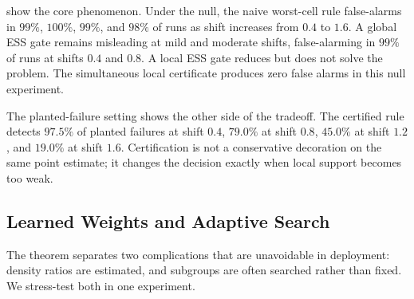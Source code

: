 \begin{table}[t]
\centering
\caption{Synthetic audit decisions. Entries are alarm rates over \(200\) seeds. Under the null, every alarm is false. In the planted setting, the certified-alarm column is power.}
\label{tab:synthetic-decisions}
\end{table}

 show the core phenomenon. Under the null, the naive worst-cell rule false-alarms in \(99\%\), \(100\%\), \(99\%\), and \(98\%\) of runs as shift increases from \(0.4\) to \(1.6\). A global ESS gate remains misleading at mild and moderate shifts, false-alarming in \(99\%\) of runs at shifts \(0.4\) and \(0.8\). A local ESS gate reduces but does not solve the problem. The simultaneous local certificate produces zero false alarms in this null experiment.

The planted-failure setting shows the other side of the tradeoff. The certified rule detects \(97.5\%\) of planted failures at shift \(0.4\), \(79.0\%\) at shift \(0.8\), \(45.0\%\) at shift \(1.2\), and \(19.0\%\) at shift \(1.6\). Certification is not a conservative decoration on the same point estimate; it changes the decision exactly when local support becomes too weak.

\subsection{Learned Weights and Adaptive Search}

The theorem separates two complications that are unavoidable in deployment: density ratios are estimated, and subgroups are often searched rather than fixed. We stress-test both in one experiment.

